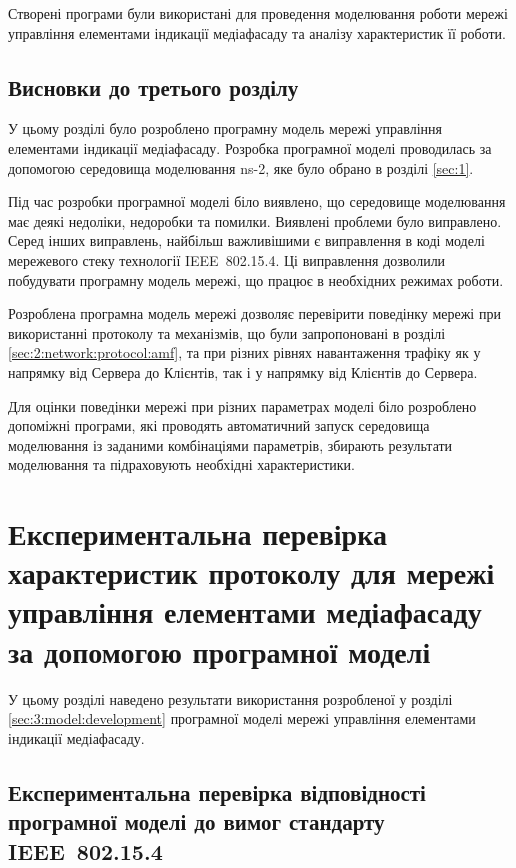 \documentclass[a4paper,ukrainian,utf8,nocolumnsxix,floatsection,equationsection]{eskdtext}
\newcommand{\iee}[0]{IEEE~802.15.4\xspace}
\begin{document}
Створені програми були використані для проведення моделювання роботи мережі управління елементами індикації медіафасаду та аналізу характеристик її роботи. 

\subsection{Висновки до третього розділу}

У цьому розділі було розроблено програмну модель мережі управління елементами індикації медіафасаду. Розробка програмної моделі проводилась за допомогою середовища моделювання ns-2, яке було обрано в розділі \ref{sec:1}.

Під час розробки програмної моделі біло виявлено, що середовище моделювання має деякі недоліки, недоробки та помилки. Виявлені проблеми було виправлено. Серед інших виправлень, найбільш важливішими є виправлення в коді моделі мережевого стеку технології \iee. Ці виправлення дозволили побудувати програмну модель мережі, що працює в необхідних режимах роботи. 

Розроблена програмна модель мережі дозволяє перевірити поведінку мережі при використанні протоколу та механізмів, що були запропоновані в розділі \ref{sec:2:network:protocol:amf}, та при різних рівнях навантаження трафіку як у напрямку від Сервера до Клієнтів, так і у напрямку від Клієнтів до Сервера.

Для оцінки поведінки мережі при різних параметрах моделі біло розроблено допоміжні програми, які проводять автоматичний запуск середовища моделювання із заданими комбінаціями параметрів, збирають результати моделювання та підраховують необхідні характеристики.

\section{Експериментальна перевірка характеристик протоколу для мережі управління елементами медіафасаду за допомогою програмної моделі}
\label{sec:4:modelling}

У цьому розділі наведено результати використання розробленої у розділі \ref{sec:3:model:development} програмної моделі мережі управління елементами індикації медіафасаду.

\subsection{Експериментальна перевірка відповідності програмної моделі до вимог стандарту \iee}
\label{sub:simulation_speed_test}
\end{document}
